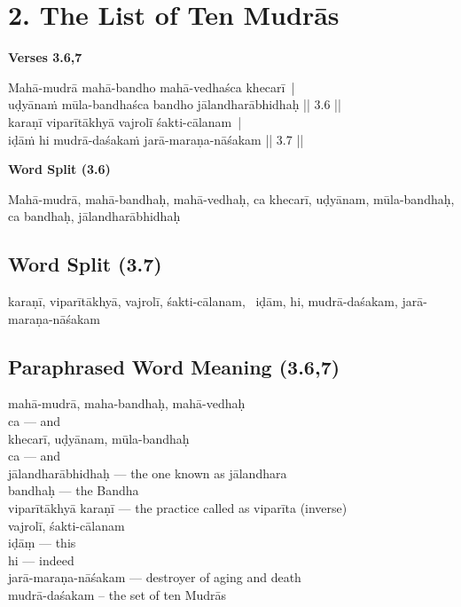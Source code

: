 \section*{2. The List of Ten Mudrās}

\noindent 
\textbf{Verses 3.6,7}

\begin{shloka}
Mahā-mudrā mahā-bandho mahā-vedhaśca khecarī |\\
uḍyānaṁ mūla-bandhaśca bandho jālandharābhidhaḥ || 3.6 ||\\
karaṇī viparītākhyā vajrolī śakti-cālanam |\\
iḍāṁ hi mudrā-daśakaṁ jarā-maraṇa-nāśakam || 3.7 ||
\end{shloka}

\noindent 
\textbf{Word Split (3.6)}

Mahā-mudrā, mahā-bandhaḥ, mahā-vedhaḥ, ca khecarī, uḍyānam, mūla-bandhaḥ, ca bandhaḥ, jālandharābhidhaḥ 

\subsection*{Word Split (3.7)}

karaṇī, viparītākhyā, vajrolī, śakti-cālanam,  iḍām, hi, mudrā-daśakam, jarā-maraṇa-nāśakam 

\subsection*{Paraphrased Word Meaning (3.6,7)}

\begin{multicols}{2}
mahā-mudrā, maha-bandhaḥ, mahā-vedhaḥ \\
ca  --- and \\
khecarī, uḍyānam, mūla-bandhaḥ \\
ca  --- and \\
jālandharābhidhaḥ --- the one known as jālandhara\\
bandhaḥ --- the Bandha \\
viparītākhyā karaṇī --- the practice called as viparīta (inverse)\\
vajrolī, śakti-cālanam \\
iḍāṃ --- this \\
hi --- indeed \\
jarā-maraṇa-nāśakam --- destroyer of aging and death\\
mudrā-daśakam – the set of ten Mudrās
\end{multicols}

